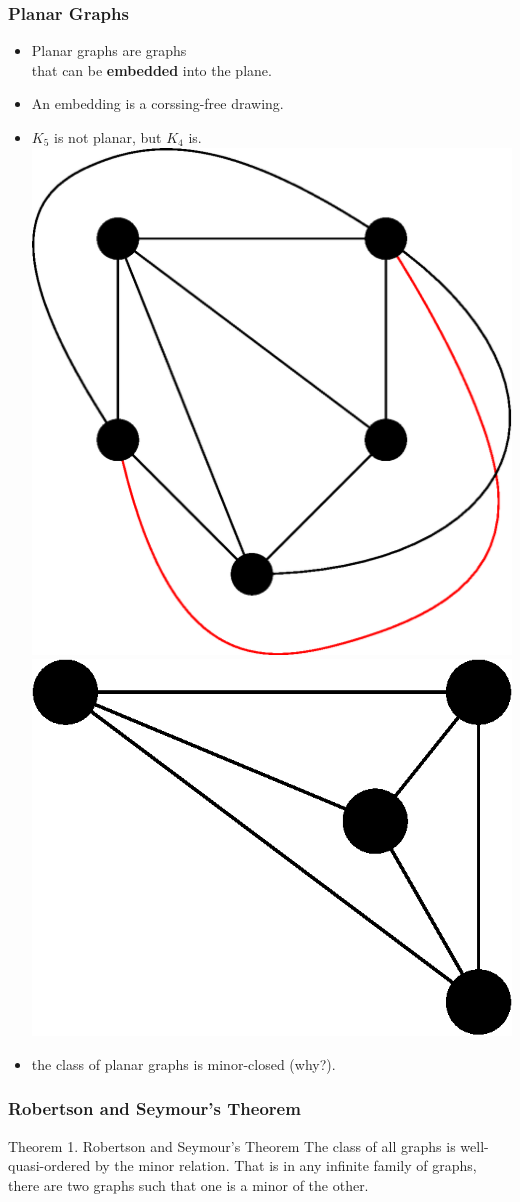 \documentclass[t,usenames,dvipsnames]{beamer}
\begin{document}
\begin{frame} \frametitle{Planar Graphs}
	\begin{itemize}[<+->]
		\item Planar graphs are graphs\\
			\hspace{1cm}that can be \textbf{embedded} into the plane.
		\item An embedding is a corssing-free drawing.
		\item $K_5$ is not planar, but $K_4$ is.\\
			{
			\includegraphics[width=0.3\linewidth]{k5.eps}
			\hspace{0.2\linewidth}
			\includegraphics[width=0.3\linewidth]{k4.eps}
			}
		\item the class of planar graphs is minor-closed (why?).
	\end{itemize}
\end{frame}
\begin{frame} \frametitle{Robertson and Seymour's Theorem}
	\begin{block}{Theorem 1. Robertson and Seymour's Theorem}
		The class of all graphs is well-quasi-ordered by the minor relation. That is in any
		infinite family of graphs, there are two graphs such that one is a minor of the
		other.
	\end{block}

	
\end{frame}
\end{document}
